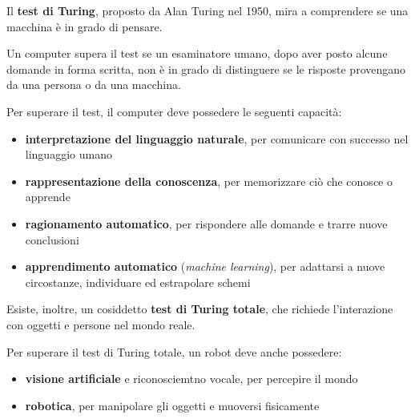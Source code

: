 \documentclass[a4paper, 12pt]{book}
\begin{document}
    \begin{tcolorbox}[
      colback=cyan!5!white,
      colframe=blue!50!black,
      title=\textbf{Test di Turing},
      coltitle=white,
      fonttitle=\bfseries,
      arc=3mm,
      boxrule=0.5pt,
      enhanced,
      breakable
    ]
      Il \textbf{test di Turing}, proposto da Alan Turing nel 1950, mira a comprendere se una macchina è in grado di pensare.

      \vspace{2mm}

      Un computer supera il test se un esaminatore umano, dopo aver posto alcune domande in forma scritta, non è in grado di distinguere se le risposte provengano da una persona o da una macchina.

      \vspace{2mm}

      Per superare il test, il computer deve possedere le seguenti capacità:
      \begin{itemize}
        \item \textbf{interpretazione del linguaggio naturale}, per comunicare con successo nel linguaggio umano
        \item \textbf{rappresentazione della conoscenza}, per memorizzare ciò che conosce o apprende
        \item \textbf{\textbf{ragionamento automatico}}, per rispondere alle domande e trarre nuove conclusioni
        \item \textbf{apprendimento automatico} (\textit{machine learning}), per adattarsi a nuove circostanze, individuare ed estrapolare schemi
      \end{itemize}

      \vspace{2mm}

      Esiste, inoltre, un cosiddetto \textbf{test di Turing totale}, che richiede l’interazione con oggetti e persone nel mondo reale.

      \vspace{2mm}

      Per superare il test di Turing totale, un robot deve anche possedere:
      \begin{itemize}
        \item \textbf{visione artificiale} e riconosciemtno vocale, per percepire il mondo
        \item \textbf{robotica}, per manipolare gli oggetti e muoversi fisicamente
      \end{itemize}
    \end{tcolorbox}
\end{document}
